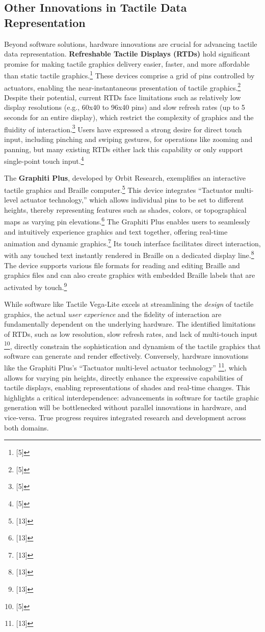 \subsection{Other Innovations in Tactile Data Representation}
Beyond software solutions, hardware innovations are crucial for advancing tactile data representation. \textbf{Refreshable Tactile Displays (RTDs)} hold significant promise for making tactile graphics delivery easier, faster, and more affordable than static tactile graphics.\footnote{[5]} These devices comprise a grid of pins controlled by actuators, enabling the near-instantaneous presentation of tactile graphics.\footnote{[5]} Despite their potential, current RTDs face limitations such as relatively low display resolutions (e.g., 60x40 to 96x40 pins) and slow refresh rates (up to 5 seconds for an entire display), which restrict the complexity of graphics and the fluidity of interaction.\footnote{[5]} Users have expressed a strong desire for direct touch input, including pinching and swiping gestures, for operations like zooming and panning, but many existing RTDs either lack this capability or only support single-point touch input.\footnote{[5]}

The \textbf{Graphiti Plus}, developed by Orbit Research, exemplifies an interactive tactile graphics and Braille computer.\footnote{[13]} This device integrates ``Tactuator\texttrademark{} multi-level actuator technology,'' which allows individual pins to be set to different heights, thereby representing features such as shades, colors, or topographical maps as varying pin elevations.\footnote{[13]} The Graphiti Plus enables users to seamlessly and intuitively experience graphics and text together, offering real-time animation and dynamic graphics.\footnote{[13]} Its touch interface facilitates direct interaction, with any touched text instantly rendered in Braille on a dedicated display line.\footnote{[13]} The device supports various file formats for reading and editing Braille and graphics files and can also create graphics with embedded Braille labels that are activated by touch.\footnote{[13]}

While software like Tactile Vega-Lite excels at streamlining the \textit{design} of tactile graphics, the actual \textit{user experience} and the fidelity of interaction are fundamentally dependent on the underlying hardware. The identified limitations of RTDs, such as low resolution, slow refresh rates, and lack of multi-touch input \footnote{[5]}, directly constrain the sophistication and dynamism of the tactile graphics that software can generate and render effectively. Conversely, hardware innovations like the Graphiti Plus's ``Tactuator\texttrademark{} multi-level actuator technology'' \footnote{[13]}, which allows for varying pin heights, directly enhance the expressive capabilities of tactile displays, enabling representations of shades and real-time changes. This highlights a critical interdependence: advancements in software for tactile graphic generation will be bottlenecked without parallel innovations in hardware, and vice-versa. True progress requires integrated research and development across both domains.


